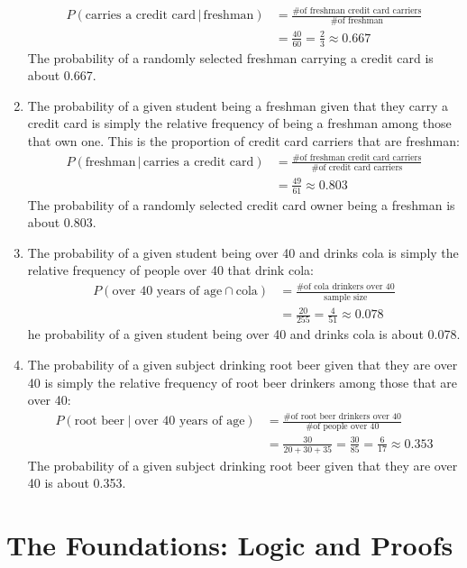 \documentclass[12pt]{article}
\begin{document}
\begin{enumerate}
\begin{align*}
						P(\text{carries a credit card} \,|\, \text{freshman}) &= \frac{\text{\# of freshman credit card carriers}}{\text{\# of freshman}} \\
							&= \frac{40}{60}
								= \frac{2}{3}
								\approx 0.667
					\end{align*}
					The probability of a randomly selected freshman carrying a credit card is about 0.667.
			\item
				The probability of a given student being a freshman given that they carry a credit card is simply the relative frequency of being a freshman among those that own one. This is the proportion of credit card carriers that are freshman:
					\begin{align*}
						P(\text{freshman} \,|\, \text{carries a credit card}) &= \frac{\text{\# of freshman credit card carriers}}{\text{\# of credit card carriers}} \\
							&= \frac{49}{61}
								\approx 0.803
					\end{align*}
					The probability of a randomly selected credit card owner being a freshman is about 0.803.
			\item
				The probability of a given student being over 40 and drinks cola is simply the relative frequency of people over 40 that drink cola:
					\begin{align*}
						P(\text{over 40 years of age} \cap \text{cola}) &= \frac{\text{\# of cola drinkers over 40}}{\text{sample size}}	 \\
							&= \frac{20}{255}
								= \frac{4}{51}
								\approx 0.078
					\end{align*}
					he probability of a given student being over 40 and drinks cola is about 0.078.
			\item
				The probability of a given subject drinking root beer given that they are over 40 is simply the relative frequency of root beer drinkers among those that are over 40:
					\begin{align*}
						P(\text{root beer} \mid \text{over 40 years of age}) &= \frac{\text{\# of root beer drinkers over 40}}{\text{\# of people over 40}} \\
							&= \frac{30}{20 + 30 + 35}
								= \frac{30}{85}
								= \frac{6}{17}
								\approx 0.353
					\end{align*}
					The probability of a given subject drinking root beer given that they are over 40 is about 0.353.
		\end{enumerate}
	\setcounter{section}{0}
	\section{The Foundations: Logic and Proofs}
\end{document}
